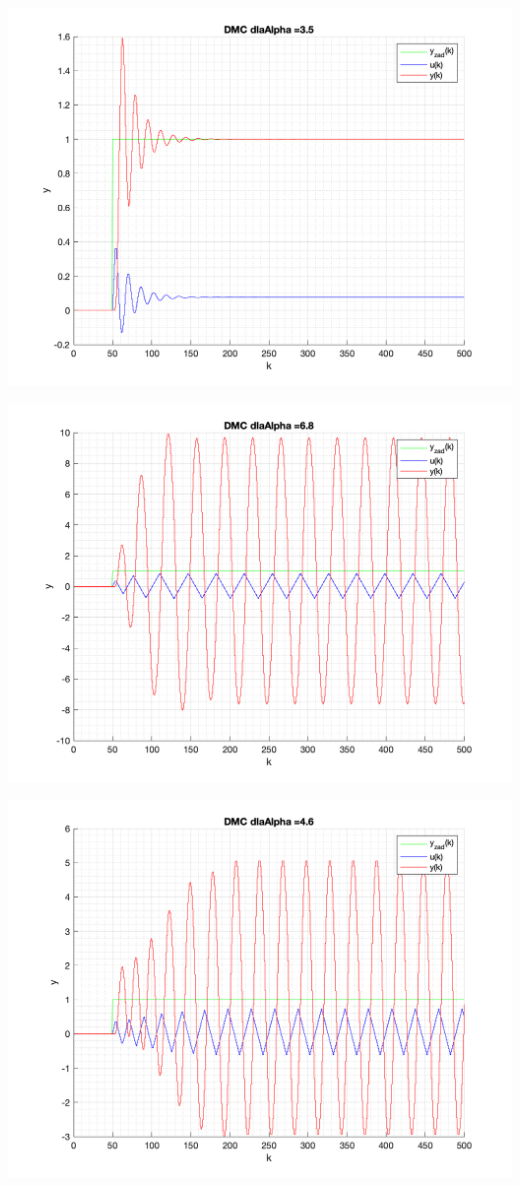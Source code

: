 \documentclass[a4paper, 11pt]{article}
\begin{document}
\begin{enumerate}
 \includegraphics[width=\linewidth]{./ModelsDodatkowe_Alpha/P4_DMC_Alpha_3_5_png.png} 
 
 \includegraphics[width=\linewidth]{./ModelsDodatkowe_Alpha/P4_DMC_Alpha_6_8_png.png} 
 
 \includegraphics[width=\linewidth]{./ModelsDodatkowe_Alpha/P4_DMC_Alpha_4_6_png.png} 
 

\end{enumerate}
\end{document}
